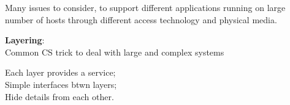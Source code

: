 \begin{frame}\begin{center}\normalsize
Many issues to consider, to support different applications running on large number of hosts through different access technology and physical media.
\end{center}\end{frame}

\begin{frame}[plain]
\end{frame}

\begin{frame}\begin{center}\large
\textbf{Layering}:\\Common CS trick to deal with large and complex systems
\end{center}\end{frame}

\begin{frame}\begin{center}\large
Each layer provides a service;\\ Simple interfaces btwn layers;\\ Hide details from each other.
\end{center}\end{frame}

